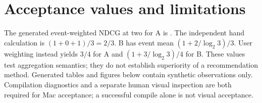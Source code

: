 \section{Acceptance values and limitations}
The generated event-weighted NDCG at two for A is \FixtureNDCG{}.
The independent hand calculation is $(1+0+1)/3=2/3$.
B has event mean $(1+2/\log_2 3)/3$. User weighting instead yields $3/4$
for A and $(1+3/\log_2 3)/4$ for B. These values test aggregation semantics;
they do not establish superiority of a recommendation method. Generated tables
and figures below contain synthetic observations only. Compilation diagnostics
and a separate human visual inspection are both required for Mac acceptance;
a successful compile alone is not visual acceptance.
